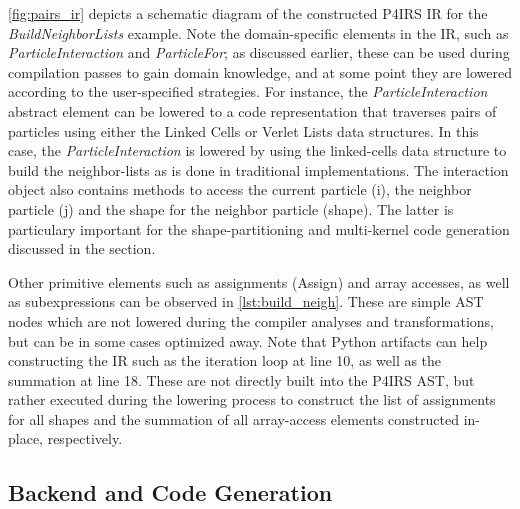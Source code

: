 \documentclass[Afour,sageh,times]{sagej}
\newcommand{\RMchange}[1]{{\color{blue} #1}}
\begin{document}
\autoref{fig:pairs_ir} depicts a schematic diagram of the constructed P4IRS \ac{IR} for the \emph{BuildNeighborLists} example.
\RMchange{Note the domain-specific elements in the IR, such as \emph{ParticleInteraction} and \emph{ParticleFor}; as discussed earlier, these can be used during compilation passes to gain domain knowledge, and at some point they are lowered according to the user-specified strategies.
For instance, the \emph{ParticleInteraction} abstract element can be lowered to a code representation that traverses pairs of particles using either the Linked Cells or Verlet Lists data structures.}
In this case, the \emph{ParticleInteraction} is lowered by using the linked-cells data structure to build the neighbor-lists as is done in traditional implementations.
The interaction object also contains methods to access the current particle (i), the neighbor particle (j) and the shape for the neighbor particle (shape).
The latter is particulary important for the shape-partitioning and multi-kernel code generation discussed in the  section.

Other primitive elements such as assignments (Assign) and array accesses, as well as subexpressions can be observed in \autoref{lst:build_neigh}.
These are simple AST nodes which are not lowered during the compiler analyses and transformations, but can be in some cases optimized away.
Note that Python artifacts can help constructing the IR such as the iteration loop at line 10, as well as the summation at line 18.
These are not directly built into the P4IRS AST, but rather executed during the lowering process to construct the list of assignments for all shapes and the summation of all array-access elements constructed in-place, respectively.

\subsection{Backend and Code Generation}
\label{sec:backend}
\end{document}
